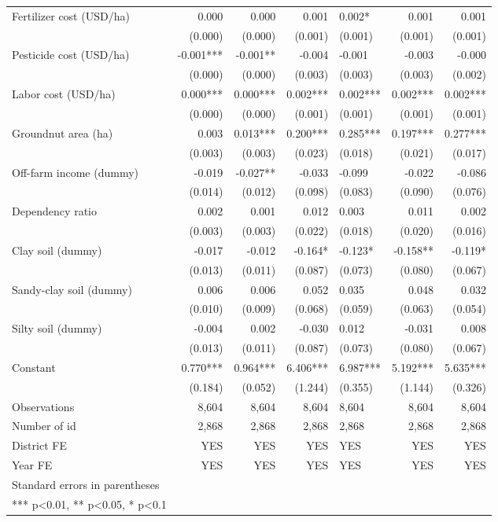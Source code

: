 \documentclass[
]{article}
\begin{document}
\begin{longtable}[t]{lrrrlrr}
Fertilizer cost (USD/ha) & 0.000 & 0.000 & 0.001 & 0.002* & 0.001 & 0.001\\
 & (0.000) & (0.000) & (0.001) & (0.001) & (0.001) & (0.001)\\
\addlinespace
Pesticide cost (USD/ha) & -0.001*** & -0.001** & -0.004 & -0.001 & -0.003 & -0.000\\
 & (0.000) & (0.000) & (0.003) & (0.003) & (0.003) & (0.002)\\
Labor cost (USD/ha) & 0.000*** & 0.000*** & 0.002*** & 0.002*** & 0.002*** & 0.002***\\
 & (0.000) & (0.000) & (0.001) & (0.001) & (0.001) & (0.001)\\
Groundnut area (ha) & 0.003 & 0.013*** & 0.200*** & 0.285*** & 0.197*** & 0.277***\\
\addlinespace
 & (0.003) & (0.003) & (0.023) & (0.018) & (0.021) & (0.017)\\
Off-farm income (dummy) & -0.019 & -0.027** & -0.033 & -0.099 & -0.022 & -0.086\\
 & (0.014) & (0.012) & (0.098) & (0.083) & (0.090) & (0.076)\\
Dependency ratio & 0.002 & 0.001 & 0.012 & 0.003 & 0.011 & 0.002\\
 & (0.003) & (0.003) & (0.022) & (0.018) & (0.020) & (0.016)\\
\addlinespace
Clay soil (dummy) & -0.017 & -0.012 & -0.164* & -0.123* & -0.158** & -0.119*\\
 & (0.013) & (0.011) & (0.087) & (0.073) & (0.080) & (0.067)\\
Sandy-clay soil (dummy) & 0.006 & 0.006 & 0.052 & 0.035 & 0.048 & 0.032\\
 & (0.010) & (0.009) & (0.068) & (0.059) & (0.063) & (0.054)\\
Silty soil (dummy) & -0.004 & 0.002 & -0.030 & 0.012 & -0.031 & 0.008\\
\addlinespace
 & (0.013) & (0.011) & (0.087) & (0.073) & (0.080) & (0.067)\\
Constant & 0.770*** & 0.964*** & 6.406*** & 6.987*** & 5.192*** & 5.635***\\
 & (0.184) & (0.052) & (1.244) & (0.355) & (1.144) & (0.326)\\
Observations & 8,604 & 8,604 & 8,604 & 8,604 & 8,604 & 8,604\\
Number of id & 2,868 & 2,868 & 2,868 & 2,868 & 2,868 & 2,868\\
\addlinespace
District FE & YES & YES & YES & YES & YES & YES\\
Year FE & YES & YES & YES & YES & YES & YES\\
Standard errors in parentheses &  &  &  &  &  & \\
*** p<0.01, ** p<0.05, * p<0.1 &  &  &  &  &  & \\*
\end{longtable}
\endgroup{}
\newpage
\end{document}
